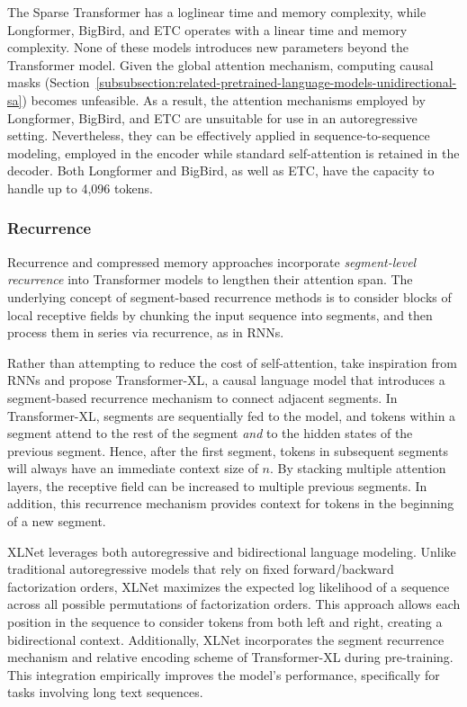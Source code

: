 The Sparse Transformer has a loglinear time and memory complexity, while Longformer, BigBird, and \ac{ETC} operates with a linear time and memory complexity. None of these models introduces new parameters beyond the Transformer model. Given the global attention mechanism, computing causal masks (Section~\ref{subsubsection:related-pretrained-language-models-unidirectional-sa}) becomes unfeasible. As a result, the attention mechanisms employed by Longformer, BigBird, and \ac{ETC} are unsuitable for use in an autoregressive setting. Nevertheless, they can be effectively applied in sequence-to-sequence modeling, employed in the encoder while standard self-attention is retained in the decoder. Both Longformer and BigBird, as well as \ac{ETC}, have the capacity to handle up to 4,096 tokens.

\subsubsection{Recurrence}
\label{subsubsection:related-long-range-modeling-recurrence}

Recurrence and compressed memory approaches incorporate \textit{segment-level recurrence} into Transformer models to lengthen their attention span. The underlying concept of segment-based recurrence methods is to consider blocks of local receptive fields by chunking the input sequence into segments, and then process them in series via recurrence, as in \acp{RNN}.

Rather than attempting to reduce the cost of self-attention, \citet{dai2019transformer} take inspiration from \acp{RNN} and propose Transformer-XL, a causal language model that introduces a segment-based recurrence mechanism to connect adjacent segments. In Transformer-XL, segments are sequentially fed to the model, and tokens within a segment attend to the rest of the segment \textit{and} to the hidden states of the previous segment. Hence, after the first segment, tokens in subsequent segments will always have an immediate context size of $n$. By stacking multiple attention layers, the receptive field can be increased to multiple previous segments. In addition, this recurrence mechanism provides context for tokens in the beginning of a new segment. 
 
XLNet \citep{yang2019xlnet} leverages both autoregressive and bidirectional language modeling. Unlike traditional autoregressive models that rely on fixed forward/backward factorization orders, XLNet maximizes the expected log likelihood of a sequence across all possible permutations of factorization orders. This approach allows each position in the sequence to consider tokens from both left and right, creating a bidirectional context. Additionally, XLNet incorporates the segment recurrence mechanism and relative encoding scheme of Transformer-XL during pre-training. This integration empirically improves the model's performance, specifically for tasks involving long text sequences. 

